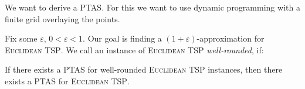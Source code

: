 \documentclass[../skript.tex]{subfiles}
\begin{document}
We want to derive a \ac{PTAS}. For this we want to use dynamic programming with a finite grid overlaying the points.

Fix some $\varepsilon$, $0 < \varepsilon < 1$. Our goal is finding a $(1 + \varepsilon)$-approximation for \textsc{Euclidean TSP}.
We call an instance of \textsc{Euclidean TSP} \emph{well-rounded}, if:
\begin{theorem} %
\label{thm:93}
If there exists a \ac{PTAS} for well-rounded \textsc{Euclidean TSP} instances, then there exists a \ac{PTAS} for \textsc{Euclidean TSP}.
\end{theorem}
\end{document}
